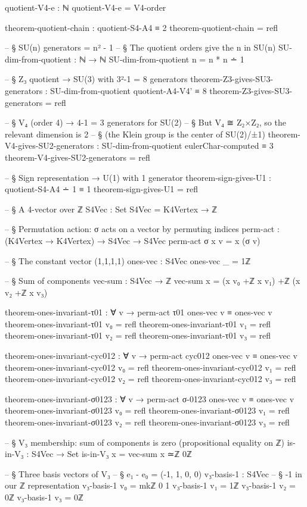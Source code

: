 \documentclass[11pt,a4paper]{book}
\begin{document}
\begin{code}
quotient-V4-e : ℕ
quotient-V4-e = V4-order

theorem-quotient-chain : quotient-S4-A4 ≡ 2
theorem-quotient-chain = refl

-- § SU(n) generators = n² - 1
-- § The quotient orders give the n in SU(n)
SU-dim-from-quotient : ℕ → ℕ
SU-dim-from-quotient n = n * n ∸ 1

-- § Z₃ quotient → SU(3) with 3²-1 = 8 generators
theorem-Z3-gives-SU3-generators : SU-dim-from-quotient quotient-A4-V4' ≡ 8
theorem-Z3-gives-SU3-generators = refl

-- § V₄ (order 4) → 4-1 = 3 generators for SU(2)
-- § But V₄ ≅ Z₂×Z₂, so the relevant dimension is 2
-- § (the Klein group is the center of SU(2)/{±1})
theorem-V4-gives-SU2-generators : SU-dim-from-quotient eulerChar-computed ≡ 3
theorem-V4-gives-SU2-generators = refl

-- § Sign representation → U(1) with 1 generator
theorem-sign-gives-U1 : quotient-S4-A4 ∸ 1 ≡ 1
theorem-sign-gives-U1 = refl

-- § A 4-vector over ℤ
S4Vec : Set
S4Vec = K4Vertex → ℤ

-- § Permutation action: σ acts on a vector by permuting indices
perm-act : (K4Vertex → K4Vertex) → S4Vec → S4Vec
perm-act σ x v = x (σ v)

-- § The constant vector (1,1,1,1)
ones-vec : S4Vec
ones-vec _ = 1ℤ

-- § Sum of components
vec-sum : S4Vec → ℤ
vec-sum x = (x v₀ +ℤ x v₁) +ℤ (x v₂ +ℤ x v₃)

theorem-ones-invariant-τ01 : ∀ v → perm-act τ01 ones-vec v ≡ ones-vec v
theorem-ones-invariant-τ01 v₀ = refl
theorem-ones-invariant-τ01 v₁ = refl
theorem-ones-invariant-τ01 v₂ = refl
theorem-ones-invariant-τ01 v₃ = refl

theorem-ones-invariant-cyc012 : ∀ v → perm-act cyc012 ones-vec v ≡ ones-vec v
theorem-ones-invariant-cyc012 v₀ = refl
theorem-ones-invariant-cyc012 v₁ = refl
theorem-ones-invariant-cyc012 v₂ = refl
theorem-ones-invariant-cyc012 v₃ = refl

theorem-ones-invariant-σ0123 : ∀ v → perm-act σ-0123 ones-vec v ≡ ones-vec v
theorem-ones-invariant-σ0123 v₀ = refl
theorem-ones-invariant-σ0123 v₁ = refl
theorem-ones-invariant-σ0123 v₂ = refl
theorem-ones-invariant-σ0123 v₃ = refl

-- § V₃ membership: sum of components is zero (propositional equality on ℤ)
is-in-V₃ : S4Vec → Set
is-in-V₃ x = vec-sum x ≃ℤ 0ℤ

-- § Three basis vectors of V₃
-- § e₁ - e₀ = (-1, 1, 0, 0)
v₃-basis-1 : S4Vec
-- § -1 in our ℤ representation
v₃-basis-1 v₀ = mkℤ 0 1
v₃-basis-1 v₁ = 1ℤ
v₃-basis-1 v₂ = 0ℤ
v₃-basis-1 v₃ = 0ℤ


\end{code}
\end{document}

